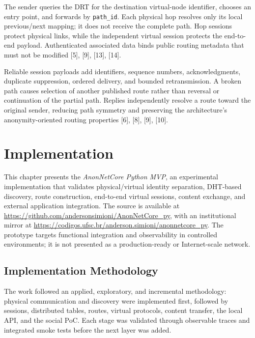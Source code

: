 \documentclass[12pt]{article}
\begin{document}
\thesisdeliverytikz

The sender queries the DRT for the destination virtual-node identifier, chooses an
entry point, and forwards by \texttt{path\_id}. Each physical hop resolves only its
local previous/next mapping; it does not receive the complete path. Hop sessions
protect physical links, while the independent virtual session protects the end-to-end
payload. Authenticated associated data binds public routing metadata that must not be
modified [5], [9], [13], [14].

Reliable session payloads add identifiers, sequence numbers, acknowledgments,
duplicate suppression, ordered delivery, and bounded retransmission. A broken path
causes selection of another published route rather than reversal or continuation of
the partial path. Replies independently resolve a route toward the original sender,
reducing path symmetry and preserving the architecture's anonymity-oriented routing
properties [6], [8], [9], [10].












\section{Implementation}

This chapter presents the \textit{AnonNetCore Python MVP}, an experimental implementation that validates physical/virtual identity separation, DHT-based discovery, route construction, end-to-end virtual sessions, content exchange, and external application integration. The source is available at \url{https://github.com/andersonsimioni/AnonNetCore_py}, with an institutional mirror at \url{https://codigos.ufsc.br/anderson.simioni/anonnetcore_py}. The prototype targets functional integration and observability in controlled environments; it is not presented as a production-ready or Internet-scale network.

\subsection{Implementation Methodology}
\label{sec:implementation-methodology}

The work followed an applied, exploratory, and incremental methodology: physical communication and discovery were implemented first, followed by sessions, distributed tables, routes, virtual protocols, content transfer, the local API, and the social PoC. Each stage was validated through observable traces and integrated smoke tests before the next layer was added.
\end{document}
